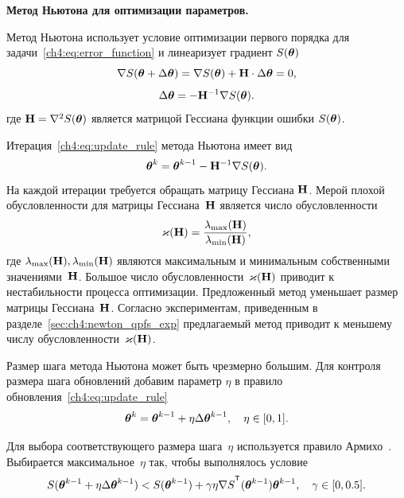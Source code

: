 \documentclass[11pt, a5paper]{dissert}
\begin{document}
\textbf{Метод Ньютона для оптимизации параметров.}
\label{sec:ch4:newton_algorithm}

Метод Ньютона использует условие оптимизации первого порядка для задачи~\eqref{ch4:eq:error_function} и линеаризует градиент $S (\boldsymbol{\theta})$
\[
	\nabla S (\boldsymbol{\theta} + \Delta \boldsymbol{\theta}) = \nabla S(\boldsymbol{\theta}) + \mathbf{H} \cdot \Delta \boldsymbol{\theta} = 0,
\]
\[
	\Delta \boldsymbol{\theta} = - \mathbf{H}^{-1} \nabla S(\boldsymbol{\theta}).
\]
где $\mathbf{H} = \nabla^2 S(\boldsymbol{\theta})$ является матрицой Гессиана функции ошибки $S(\boldsymbol{\theta})$.

Итерация~\eqref{ch4:eq:update_rule} метода Ньютона имеет вид
\[
	\boldsymbol{\theta}^k = \boldsymbol{\theta}^{k-1} - \mathbf{H}^{-1} \nabla S(\boldsymbol{\theta}).
\]
На каждой итерации требуется обращать матрицу Гессиана $\mathbf{H}$.
Мерой плохой обусловленности для матрицы Гессиана~$\mathbf{H}$ является число обусловленности
\[
	\varkappa(\mathbf{H}) = \frac{\lambda_{\text{max}}(\mathbf{H})}{\lambda_{\text{min}}(\mathbf{H})},
\]
где $\lambda_{\text{max}}(\mathbf{H}), \lambda_{\text{min}}(\mathbf{H})$ являются максимальным и минимальным собственными значениями~$\mathbf{H}$. Большое число обусловленности~$\varkappa (\mathbf{H})$ приводит к нестабильности процесса оптимизации.
Предложенный метод уменьшает размер матрицы Гессиана~$\mathbf{H}$. Согласно экспериментам, приведенным в разделе~\ref{sec:ch4:newton_qpfs_exp} предлагаемый метод приводит к меньшему числу обусловленности~$\varkappa (\mathbf{H})$.

Размер шага метода Ньютона может быть чрезмерно большим. Для контроля размера шага обновлений добавим параметр $\eta$ в правило обновления~\eqref{ch4:eq:update_rule}
\[
	\boldsymbol{\theta}^k = \boldsymbol{\theta}^{k - 1} + \eta \Delta \boldsymbol{\theta}^{k - 1}, \quad \eta \in [0, 1].
\]

Для выбора соответствующего размера шага~$\eta$ используется правило Армихо~\cite{armijo1966minimization}. Выбирается максимальное~$\eta$ так, чтобы выполнялось условие
\[
	S(\btheta^{k - 1} + \eta \Delta \btheta^{k - 1}) < S(\btheta^{k - 1}) + \gamma \eta \nabla S^{\T}(\btheta^{k-1})\btheta^{k - 1}, \quad \gamma \in [0, 0.5].
\]
\end{document}
